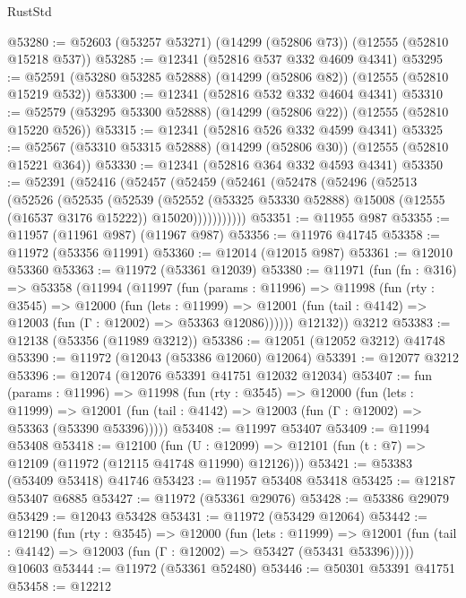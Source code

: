 \begin{lexlean}{RustStd}
\begin{coremodule}
@53280 := @52603 (@53257 @53271) (@14299 (@52806 @73)) (@12555 (@52810 @15218 @537))
@53285 := @12341 (@52816 @537 @332 @4609 @4341)
@53295 := @52591 (@53280 @53285 @52888) (@14299 (@52806 @82)) (@12555 (@52810 @15219 @532))
@53300 := @12341 (@52816 @532 @332 @4604 @4341)
@53310 := @52579 (@53295 @53300 @52888) (@14299 (@52806 @22)) (@12555 (@52810 @15220 @526))
@53315 := @12341 (@52816 @526 @332 @4599 @4341)
@53325 := @52567 (@53310 @53315 @52888) (@14299 (@52806 @30)) (@12555 (@52810 @15221 @364))
@53330 := @12341 (@52816 @364 @332 @4593 @4341)
@53350 := @52391
    (@52416
      (@52457
        (@52459
          (@52461
            (@52478
              (@52496
                (@52513
                  (@52526
                    (@52535
                      (@52539
                        (@52552
                          (@53325 @53330 @52888)
                          @15008
                          (@12555 (@16537 @3176 @15222))
                          @15020)))))))))))
@53351 := @11955 @987
@53355 := @11957 (@11961 @987) (@11967 @987)
@53356 := @11976 @41745
@53358 := @11972 (@53356 @11991)
@53360 := @12014 (@12015 @987)
@53361 := @12010 @53360
@53363 := @11972 (@53361 @12039)
@53380 := @11971
    (fun (fn : @316) =>
    @53358
      (@11994
        (@11997
          (fun (params : @11996) =>
          @11998
            (fun (rty : @3545) =>
            @12000
              (fun (lets : @11999) =>
              @12001 (fun (tail : @4142) => @12003 (fun (Γ : @12002) => @53363 @12086))))))
        @12132))
    @3212
@53383 := @12138 (@53356 (@11989 @3212))
@53386 := @12051 (@12052 @3212) @41748
@53390 := @11972 (@12043 (@53386 @12060) @12064)
@53391 := @12077 @3212
@53396 := @12074 (@12076 @53391 @41751 @12032 @12034)
@53407 := fun (params : @11996) =>
  @11998
    (fun (rty : @3545) =>
    @12000
      (fun (lets : @11999) =>
      @12001 (fun (tail : @4142) => @12003 (fun (Γ : @12002) => @53363 (@53390 @53396)))))
@53408 := @11997 @53407
@53409 := @11994 @53408
@53418 := @12100
    (fun (U : @12099) => @12101 (fun (t : @7) => @12109 (@11972 (@12115 @41748 @11990) @12126)))
@53421 := @53383 (@53409 @53418) @41746
@53423 := @11957 @53408 @53418
@53425 := @12187 @53407 @6885
@53427 := @11972 (@53361 @29076)
@53428 := @53386 @29079
@53429 := @12043 @53428
@53431 := @11972 (@53429 @12064)
@53442 := @12190
    (fun (rty : @3545) =>
    @12000
      (fun (lets : @11999) =>
      @12001 (fun (tail : @4142) => @12003 (fun (Γ : @12002) => @53427 (@53431 @53396)))))
    @10603
@53444 := @11972 (@53361 @52480)
@53446 := @50301 @53391 @41751
@53458 := @12212

\end{coremodule}
\end{lexlean}
